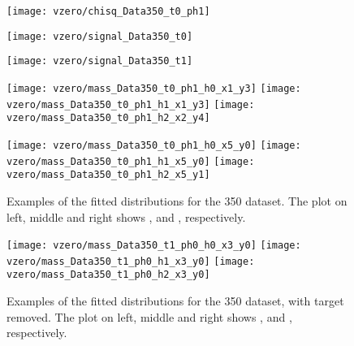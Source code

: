 \clearpage

\begin{figure}
  \centering
  \texttt{[image: vzero/chisq\_Data350\_t0\_ph1]}
  
  \caption{}
  \label{fig:hadron:vzero:signal:chi:350}
\end{figure}


\begin{figure}
  \centering
  \texttt{[image: vzero/signal\_Data350\_t0]}
  
  \caption{}
  \label{fig:hadron:vzero:signal:extracted:350in}
\end{figure}

\begin{figure}
  \centering
  \texttt{[image: vzero/signal\_Data350\_t1]}
  
  \caption{}
  \label{fig:hadron:vzero:signal:extracted:350out}
\end{figure}


\begin{figure}[!ht]
  \centering
  \texttt{[image: vzero/mass\_Data350\_t0\_ph1\_h0\_x1\_y3]}
  \texttt{[image: vzero/mass\_Data350\_t0\_ph1\_h1\_x1\_y3]}
  \texttt{[image: vzero/mass\_Data350\_t0\_ph1\_h2\_x2\_y4]}

  \vspace{0.5cm}
    
  \texttt{[image: vzero/mass\_Data350\_t0\_ph1\_h0\_x5\_y0]}
  \texttt{[image: vzero/mass\_Data350\_t0\_ph1\_h1\_x5\_y0]}
  \texttt{[image: vzero/mass\_Data350\_t0\_ph1\_h2\_x5\_y1]}

  
  \caption{Examples of the fitted \minv distributions for the 350 \GeVc dataset. The plot on left, middle and right shows \lamb, \antilamb and \kzeros, respectively.}
  \label{fig:hadron:vzero:signal:dist:350:in}
\end{figure}



\begin{figure}[!ht]
  \centering
  \texttt{[image: vzero/mass\_Data350\_t1\_ph0\_h0\_x3\_y0]}
  \texttt{[image: vzero/mass\_Data350\_t1\_ph0\_h1\_x3\_y0]}
  \texttt{[image: vzero/mass\_Data350\_t1\_ph0\_h2\_x3\_y0]}
  
  \caption{Examples of the fitted \minv distributions for the 350 \GeVc dataset, with target removed. The plot on left, middle and right shows \lamb, \antilamb and \kzeros, respectively.}
  \label{fig:hadron:vzero:signal:dist:350:out}
\end{figure}


